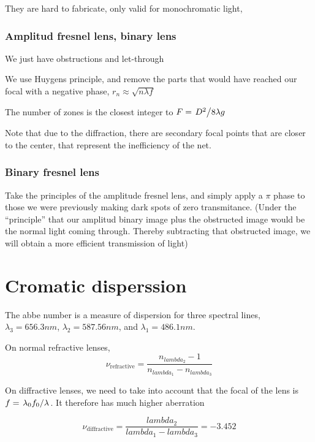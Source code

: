 \documentclass[../main/main.tex]{subfiles}
\begin{document}
They are hard to fabricate, only valid for monochromatic light,

\subsubsection{Amplitud fresnel lens, binary lens}

We just have obstructions and let-through

We use Huygens principle, and remove the parts that would have reached our focal with a negative phase, $r_{n} \approx \sqrt{n \lambda f}$

The number of zones is the closest integer to $F = \flatfrac{D^{2}}{8\lambda g}$

Note that due to the diffraction, there are secondary focal points that are closer to the center, that represent the inefficiency of the net.

\subsubsection{Binary fresnel lens}

Take the principles of the amplitude fresnel lens, and simply apply a $\pi$ phase to those we were previously making dark spots of zero transmitance. (Under the ``principle'' that our amplitud binary image plus the obstructed image would be the normal light coming through. Thereby subtracting that obstructed image, we will obtain a more efficient transmission of light)


\section{Cromatic disperssion}

The abbe number is a measure of dispersion for three spectral lines, $\lambda_{3}=656.3 nm$, $\lambda_{2}=587.56 nm$, and $\lambda_{1}=486.1 nm.$

On normal refractive lenses,
\begin{equation}
\nu_{\textrm{refractive}} = \frac{n_{lambda_{2}} - 1} {n_{lambda_{1}}-n_{lambda_{3}}}
\end{equation}

On diffractive lenses, we need to take into account that the focal of the lens is $f = \flatfrac{\lambda_{0} f_{0}}{\lambda}$. It therefore has much higher aberration

\begin{equation}
\nu_{\textrm{diffractive}} = \frac{{lambda_{2}} } {{lambda_{1}}-{lambda_{3}}} = -3.452
\end{equation}
\end{document}
